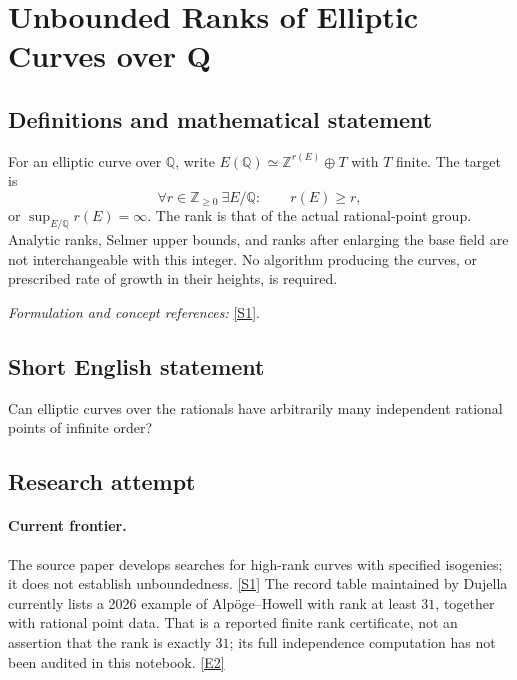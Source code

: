\documentclass[11pt,a4paper]{article}
\newcommand{\Z}{\mathbb{Z}}
\newcommand{\Q}{\mathbb{Q}}
\newcommand{\sref}[2]{\hyperlink{source:#1:#2}{[S#2]}}
\newcommand{\eref}[2]{\hyperlink{extra:#1:#2}{[E#2]}}
\newif\ifshowcatalogue
\newcommand{\cataloguescope}[1]{\ifshowcatalogue
 \paragraph{Exact scope in the supplied catalogue.}
 \begin{quote}\small #1\end{quote}\fi}
\numberwithin{equation}{section}
\begin{document}
\setcounter{section}{0}
\clearpage
\section*{\texorpdfstring{Unbounded Ranks of Elliptic Curves over Q}{Unbounded Ranks of Elliptic Curves over Q}}\label{statement}
\subsection{Definitions and mathematical statement}
For an elliptic curve over $\Q$, write $E(\Q)\simeq\Z^{r(E)}\oplus T$ with $T$ finite. The target is
\[
 \forall r\in\Z_{\ge0}\ \exists E/\Q:\qquad r(E)\ge r,
\]
or $\sup_{E/\Q}r(E)=\infty$. The rank is that of the actual rational-point group. Analytic ranks, Selmer upper bounds, and ranks after enlarging the base field are not interchangeable with this integer. No algorithm producing the curves, or prescribed rate of growth in their heights, is required.
\par\smallskip\textit{Formulation and concept references:} \sref{statement}{1}.
\cataloguescope{Prove that for EVERY nonnegative integer r there is SOME elliptic curve E/Q whose actual Mordell-Weil group E(Q) has Z-rank at least r. The base field is exactly Q and rank means the free abelian rank in Mordell's theorem, not analytic rank, a Selmer bound or random-matrix corank. Thus the set of actual ranks of ALL elliptic curves over Q is unbounded. Counting one representative per Q-isomorphism class does not alter this existence question. No effective construction, specified family, uniform curve-producing algorithm or predetermined rate of growth is required.}
\subsection{Short English statement}
Can elliptic curves over the rationals have arbitrarily many independent rational points of infinite order?
\subsection{Research attempt}

\paragraph{Current frontier.}
The source paper develops searches for high-rank curves with specified
isogenies; it does not establish unboundedness. \sref{statement}{1}
The record table maintained by Dujella currently lists a 2026 example of
Alp\"oge--Howell with rank at least $31$, together with rational point data.
That is a reported finite rank certificate, not an assertion that the rank
is exactly $31$; its full independence computation has not been audited in
this notebook. \eref{statement}{2}
\end{document}
